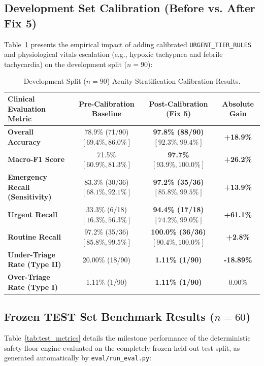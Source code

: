\documentclass[11pt,a4paper]{article}
\begin{document}
\subsection{Development Set Calibration (Before vs. After Fix 5)}
Table~\ref{tab:dev_calibration} presents the empirical impact of adding calibrated \texttt{URGENT\_TIER\_RULES} and physiological vitals escalation (e.g., hypoxic tachypnea and febrile tachycardia) on the development split ($n=90$):

\begin{table}[htbp]
\centering
\small
\begin{tabularx}{\textwidth}{X c c c}
\toprule
\textbf{Clinical Evaluation Metric} & \textbf{Pre-Calibration Baseline} & \textbf{Post-Calibration (Fix 5)} & \textbf{Absolute Gain} \\
\midrule
\textbf{Overall Accuracy} & 78.9\% (71/90) $[69.4\%, 86.0\%]$ & \textbf{97.8\% (88/90) $[92.3\%, 99.4\%]$} & \textbf{+18.9\%} \\
\textbf{Macro-F1 Score} & 71.5\% $[60.9\%, 81.3\%]$ & \textbf{97.7\% $[93.9\%, 100.0\%]$} & \textbf{+26.2\%} \\
\textbf{Emergency Recall (Sensitivity)} & 83.3\% (30/36) $[68.1\%, 92.1\%]$ & \textbf{97.2\% (35/36) $[85.8\%, 99.5\%]$} & \textbf{+13.9\%} \\
\textbf{Urgent Recall} & 33.3\% (6/18) $[16.3\%, 56.3\%]$ & \textbf{94.4\% (17/18) $[74.2\%, 99.0\%]$} & \textbf{+61.1\%} \\
\textbf{Routine Recall} & 97.2\% (35/36) $[85.8\%, 99.5\%]$ & \textbf{100.0\% (36/36) $[90.4\%, 100.0\%]$} & \textbf{+2.8\%} \\
\textbf{Under-Triage Rate (Type II)} & 20.00\% (18/90) & \textbf{1.11\% (1/90)} & \textbf{-18.89\%} \\
\textbf{Over-Triage Rate (Type I)} & 1.11\% (1/90) & \textbf{1.11\% (1/90)} & 0.00\% \\
\bottomrule
\end{tabularx}
\caption{Development Split ($n=90$) Acuity Stratification Calibration Results.}
\label{tab:dev_calibration}
\end{table}

\subsection{Frozen TEST Set Benchmark Results ($n=60$)}
Table~\ref{tab:test_metrics} details the milestone performance of the deterministic safety-floor engine evaluated on the completely frozen held-out test split, as generated automatically by \texttt{eval/run\_eval.py}:
\end{document}
